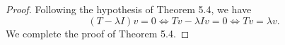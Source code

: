 \begin{Exercise}
\begin{proof}
Following the hypothesis of Theorem 5.4, we have
$$
(T-\lambda I) v = 0 \iff T v - \lambda I v = 0 \iff T v = \lambda v.
$$
We complete the proof of Theorem 5.4.
\end{proof}
\end{Exercise}